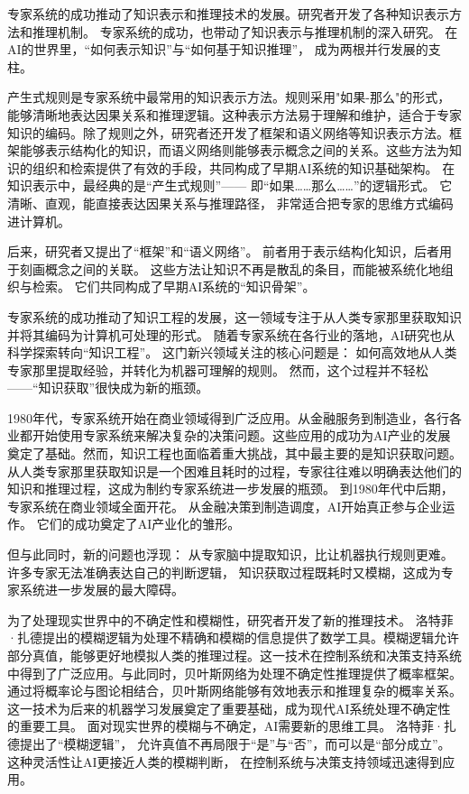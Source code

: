 专家系统的成功推动了知识表示和推理技术的发展。研究者开发了各种知识表示方法和推理机制。
专家系统的成功，也带动了知识表示与推理机制的深入研究。  
在AI的世界里，“如何表示知识”与“如何基于知识推理”，  
成为两根并行发展的支柱。  

产生式规则是专家系统中最常用的知识表示方法。规则采用"如果-那么"的形式，能够清晰地表达因果关系和推理逻辑。这种表示方法易于理解和维护，适合于专家知识的编码。除了规则之外，研究者还开发了框架和语义网络等知识表示方法。框架能够表示结构化的知识，而语义网络则能够表示概念之间的关系。这些方法为知识的组织和检索提供了有效的手段，共同构成了早期AI系统的知识基础架构。
在知识表示中，最经典的是“产生式规则”——  
即“如果……那么……”的逻辑形式。  
它清晰、直观，能直接表达因果关系与推理路径，  
非常适合把专家的思维方式编码进计算机。  

后来，研究者又提出了“框架”和“语义网络”。  
前者用于表示结构化知识，后者用于刻画概念之间的关联。  
这些方法让知识不再是散乱的条目，而能被系统化地组织与检索。  
它们共同构成了早期AI系统的“知识骨架”。  

专家系统的成功推动了知识工程的发展，这一领域专注于从人类专家那里获取知识并将其编码为计算机可处理的形式。
随着专家系统在各行业的落地，AI研究也从科学探索转向“知识工程”。  
这门新兴领域关注的核心问题是：  
如何高效地从人类专家那里提取经验，并转化为机器可理解的规则。  
然而，这个过程并不轻松——“知识获取”很快成为新的瓶颈。  

1980年代，专家系统开始在商业领域得到广泛应用。从金融服务到制造业，各行各业都开始使用专家系统来解决复杂的决策问题。这些应用的成功为AI产业的发展奠定了基础。然而，知识工程也面临着重大挑战，其中最主要的是知识获取问题。从人类专家那里获取知识是一个困难且耗时的过程，专家往往难以明确表达他们的知识和推理过程，这成为制约专家系统进一步发展的瓶颈。
到1980年代中后期，专家系统在商业领域全面开花。  
从金融决策到制造调度，AI开始真正参与企业运作。  
它们的成功奠定了AI产业化的雏形。  

但与此同时，新的问题也浮现：  
从专家脑中提取知识，比让机器执行规则更难。  
许多专家无法准确表达自己的判断逻辑，  
知识获取过程既耗时又模糊，这成为专家系统进一步发展的最大障碍。  

为了处理现实世界中的不确定性和模糊性，研究者开发了新的推理技术。
洛特菲·扎德提出的模糊逻辑为处理不精确和模糊的信息提供了数学工具。模糊逻辑允许部分真值，能够更好地模拟人类的推理过程。这一技术在控制系统和决策支持系统中得到了广泛应用。与此同时，贝叶斯网络为处理不确定性推理提供了概率框架。通过将概率论与图论相结合，贝叶斯网络能够有效地表示和推理复杂的概率关系。这一技术为后来的机器学习发展奠定了重要基础，成为现代AI系统处理不确定性的重要工具。
面对现实世界的模糊与不确定，AI需要新的思维工具。  
洛特菲·扎德提出了“模糊逻辑”，  
允许真值不再局限于“是”与“否”，而可以是“部分成立”。  
这种灵活性让AI更接近人类的模糊判断，  
在控制系统与决策支持领域迅速得到应用。  

